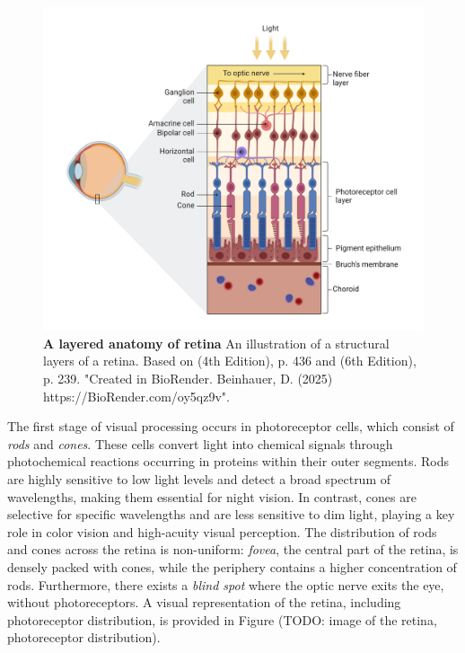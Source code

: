 \begin{figure}
    \centering
    \includegraphics[width=\linewidth]{img/retina_anatomy.pdf}
    \caption{\textbf{A layered anatomy of retina} An illustration of a structural layers of a retina. Based on \citet{schwartz1991principles} (4th Edition), p. 436 and \citet{purves2019neurosciences} (6th Edition), p. 239. "Created in BioRender. Beinhauer, D. (2025) https://BioRender.com/oy5qz9v".}
    \label{fig:retina_anatomy}
\end{figure}

The first stage of visual processing occurs in photoreceptor cells,
which consist of \emph{rods} and \emph{cones}. These cells convert light into
chemical signals through photochemical reactions occurring in proteins within
their outer segments. Rods are highly sensitive to low light levels and detect
a broad spectrum of wavelengths, making them essential for night vision. 
In contrast, cones are selective for specific wavelengths and are less sensitive
to dim light, playing a key role in color vision and high-acuity visual perception. 
The distribution of rods and cones across the retina is non-uniform: \emph{fovea},
the central part of the retina, is densely packed with cones, while the periphery
contains a higher concentration of rods. Furthermore, there exists a \emph{blind spot} 
where the optic nerve exits the eye, without photoreceptors. A visual representation
of the retina, including photoreceptor distribution, is provided in Figure
(TODO: image of the retina, photoreceptor distribution).

